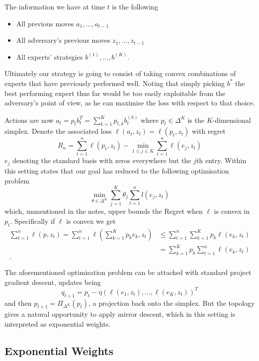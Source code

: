 The information we have at time $t$ is the following
\begin{itemize}
\item All previous moves $a_1,\dots,a_{t-1}$
\item All adversary's previous moves $z_1,\dots,z_{t-1}$
\item All experts' strategies $b^{(1)},\dots,b^{(K)}$.
\end{itemize}

Ultimately our strategy is going to consist of taking convex combinations of experts that have previously performed well. Noting that simply picking $b^{*}$ the best performing expert thus far would be too easily exploitable from the adversary's point of view, as he can maximise the loss with respect to that choice.

Actions are now $a_t = p_t b^T_t = \sum_{k=1}^K p_{t,k} b_t^{(k)} $ where $p_t \in \Delta^{K}$ is the $K$-dimensional simplex. Denote the associated loss $\ell(a_t,z_t) = \ell(p_t,z_t)$ with regret
$$
	R_n = \sum_{t=1}^n \ell(p_t,z_t) - \min_{1 \leq j \leq K} \sum_{t=1}^n \ell(e_j,z_t)
$$
$e_j$ denoting the standard basis with zeros everywhere but the $j$th entry. Within this setting \cite{rigollet} states that our goal has reduced to the following optimisation problem
$$
	\min_{\theta \in \Delta^{K}} \sum_{j=1}^K \theta_j \sum_{t=1}^n l(e_j,z_t)
$$
which, unmentioned in the notes, upper bounds the Regret when $\ell$ is convex in $p_t$. Specifically if $\ell$ is convex we get
\begin{align*}
\sum_{t=1}^n \ell(p,z_t) = \sum_{t=1}^n \ell \left(\sum_{k=1}^K p_k e_k ,z_t \right) & \leq \sum_{t=1}^n \sum_{k=1}^K  p_k \ell(e_k ,z_t)\\
& = \sum_{k=1}^K p_k  \sum_{t=1}^n   \ell(e_k ,z_t)\\.
\end{align*}

The aforementioned optimisation problem can be attacked with standard project gradient descent, updates being
$$
	q_{t+1} = p_t - \eta \left( \ell(e_1,z_t),\dots,\ell(e_K,z_t)\right)^T
$$
and then $p_{t+1} = \Pi_{\Delta^K}(p_t)$, a projection back onto the simplex. But the topology gives a natural opportunity to apply mirror descent, which in this setting is interpreted as exponential weights.

\subsection{Exponential Weights}

